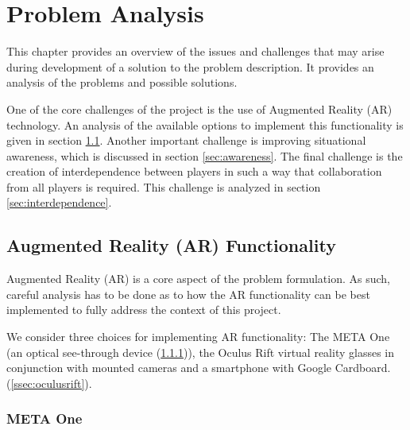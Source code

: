 \chapter{Problem Analysis} \label{cha:analysis}
	This chapter provides an overview of the issues and challenges that may
	arise during development of a solution to the problem description. It
	provides an analysis of the problems and possible solutions.

	One of the core challenges of the project is the use of Augmented Reality
	(AR) technology. An analysis of the available options to implement this
	functionality is given in section \ref{sec:ar}. Another important challenge
	is improving situational awareness, which is discussed in section
	\ref{sec:awareness}. The final challenge is the creation of interdependence
	between players in such a way that collaboration from all players is
	required. This challenge is analyzed in section \ref{sec:interdependence}.

	\section{Augmented Reality (AR) Functionality} \label{sec:ar}
		Augmented Reality (AR) is a core aspect of the problem formulation.
		As such, careful analysis has to be done as to how the AR functionality
		can be best implemented to fully address the context of this project.

		We consider three choices for implementing AR functionality: The META
		One (an optical see-through device (\ref{ssec:metaone})), the Oculus
		Rift virtual reality glasses in conjunction with mounted cameras and a
		smartphone with Google Cardboard.
		(\ref{ssec:oculusrift}).

		\subsection{META One} \label{ssec:metaone}

